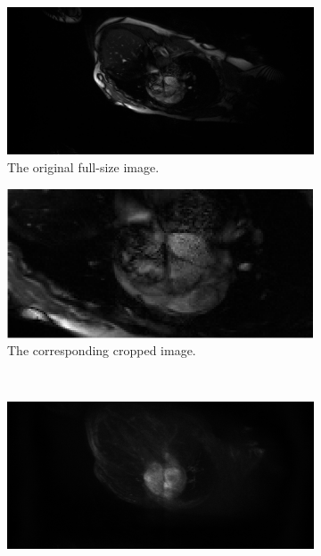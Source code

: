 \documentclass[english,version-2022-01]{uzl-thesis} %
\begin{document}
\begin{figure}[h]%
	\centering
	\graphicspath{{images/}{\main/images/}}
	\begin{subfigure}{0.4\textwidth}
    		\includegraphics[width=\textwidth]{FullImage.png}
    		\caption{The original full-size image.}
    		\label{fig:fullImage}
	\end{subfigure}
	\hfill
	\begin{subfigure}{0.4\textwidth}
    		\includegraphics[width=\textwidth]{ImageCrop.png}
    		\caption{The corresponding cropped image.}
    		\label{fig:ImageCropped}
	\end{subfigure}
	\\
	\begin{subfigure}{0.4\textwidth}
    		\includegraphics[width=\textwidth]{DifferencesSlices.png}

\end{subfigure}
\end{figure}
\end{document}
